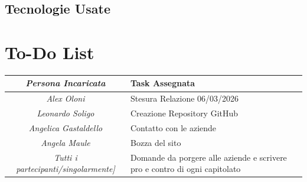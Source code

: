 \documentclass[a4paper,12pt]{article}
\begin{document}
\subsection{Tecnologie Usate}
\section{To-Do List}
\begin{table}[h]
    \centering
    \begin{tabular}{|c|p{}|}
    \hline
        \rowcolor{lightgray}\textit{\textbf{Persona Incaricata}}  & \textbf{Task Assegnata}\\
    \hline
         \textit {Alex Oloni}  &  Stesura Relazione 06/03/2026\\
    \hline
        \textit {Leonardo Soligo} & Creazione Repository GitHub \\
    \hline
         \textit {Angelica Gastaldello} & Contatto con le aziende\\
    \hline
        \textit{Angela Maule} &  Bozza del sito\\
    \hline
        \textit{Tutti i partecipanti/singolarmente] } & Domande da porgere alle aziende e scrivere pro e contro di ogni capitolato\\
    \hline
    \end{tabular}
    \label{tab:placeholder}
\end{table}
\end{document}
